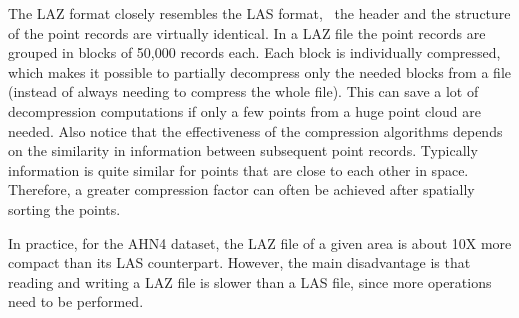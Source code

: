 The LAZ format closely resembles the LAS format, \ie\ the header and the structure of the point records are virtually identical.
In a LAZ file the point records are grouped in blocks of 50,000 records each.
Each block is individually compressed, which makes it possible to partially decompress only the needed blocks from a file (instead of always needing to compress the whole file).
This can save a lot of decompression computations if only a few points from a huge point cloud are needed.
Also notice that the effectiveness of the compression algorithms depends on the similarity in information between subsequent point records.
Typically information is quite similar for points that are close to each other in space.
Therefore, a greater compression factor can often be achieved after spatially sorting the points.

In practice, for the AHN4 dataset, the LAZ file of a given area is about 10X more compact than its LAS counterpart.
However, the main disadvantage is that reading and writing a LAZ file is slower than a LAS file, since more operations need to be performed.

